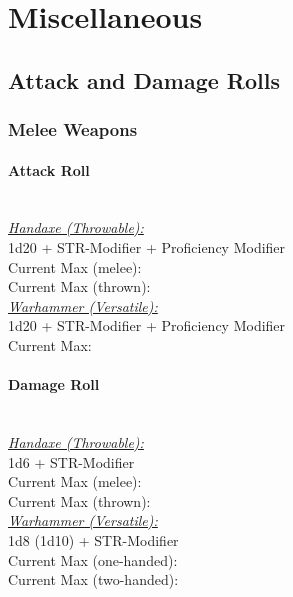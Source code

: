 \documentclass[letterpaper,openany,oneside,twocolumn]{book}
\begin{document}
\vfill\eject

\section*{Miscellaneous}
\subsection*{Attack and Damage Rolls}
\subsubsection*{Melee Weapons}
\paragraph*{Attack Roll}\hfill\\
\underline{\textit{Handaxe (Throwable):}}\\
1d20 + STR-Modifier + Proficiency Modifier\\
\indent Current Max (melee): \\
\indent Current Max (thrown): 
\\
\underline{\textit{Warhammer (Versatile):}}\\
1d20 + STR-Modifier + Proficiency Modifier\\
\indent Current Max: 
\paragraph*{Damage Roll}\hfill\\
\underline{\textit{Handaxe (Throwable):}}\\
1d6 + STR-Modifier\\
\indent Current Max (melee): \\
\indent Current Max (thrown): 
\\
\underline{\textit{Warhammer (Versatile):}}\\
1d8 (1d10) + STR-Modifier\\
\indent Current Max (one-handed): \\
\indent Current Max (two-handed): 
\end{document}

